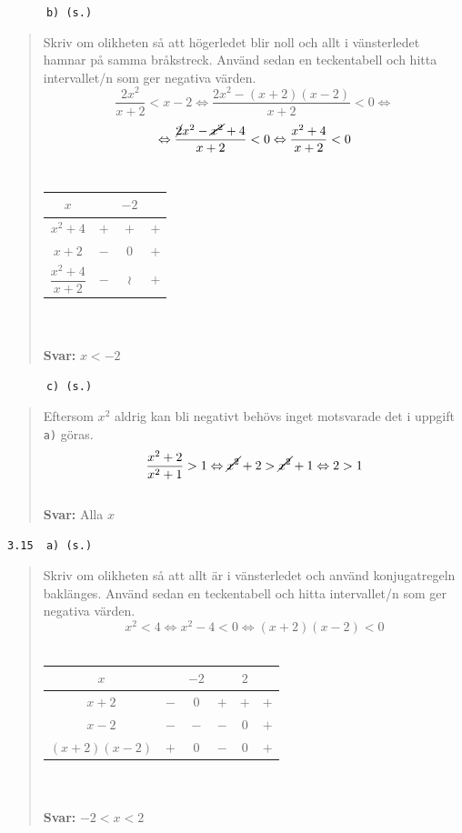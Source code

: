 \documentclass[a4paper]{article}
\newcommand{\tskcol}[1]{\textcolor{tskcol}{#1}}
\begin{document}
	\texttt{\tskcol{~~~~~~b) (s.)}}
	\begin{quotation}
		\noindent
		Skriv om olikheten så att högerledet blir noll och allt i vänsterledet hamnar på samma bråkstreck. Använd sedan en teckentabell och hitta intervallet/n som ger negativa värden.
		\[\dfrac{2x^2}{x+2}<x-2 \Leftrightarrow
		\dfrac{2x^2-(x+2)(x-2)}{x+2}<0 \Leftrightarrow\]
		\[\Leftrightarrow \dfrac{\cancel{2}x^2-\cancel{x^2}+4}{x+2}<0 \Leftrightarrow
		\dfrac{x^2+4}{x+2}<0\] \\
		\begin{tabular}{c|c|c|c}
			$x$ & & $-2$ & \\ \hline
			$x^2+4$              & $+$ & $+$ & $+$ \\
			$x+2$                & $-$ & $0$ & $+$ \\ \hline
			$\dfrac{x^2+4}{x+2}$ & $-$ &$\wr$& $+$ 
		\end{tabular}
		\\ \\
		\textbf{Svar:} $x<-2$
	\end{quotation}
	
	\pagebreak
	\texttt{\tskcol{~~~~~~c) (s.)}}
	\begin{quotation}
		\noindent
		Eftersom $x^2$ aldrig kan bli negativt behövs inget motsvarade det i uppgift \texttt{\tskcol{a)}} göras.
		\[\dfrac{x^2+2}{x^2+1}>1 \Leftrightarrow
		\cancel{x^2}+2>\cancel{x^2}+1 \Leftrightarrow
		2>1\]
		\\
		\textbf{Svar:} Alla $x$
	\end{quotation}
	
	\texttt{\tskcol{3.15~~a) (s.)}}
	\begin{quotation}
		\noindent
		Skriv om olikheten så att allt är i vänsterledet och använd konjugatregeln baklänges. Använd sedan en teckentabell och hitta intervallet/n som ger negativa värden.
		\[x^2<4 \Leftrightarrow
		x^2-4<0 \Leftrightarrow
		(x+2)(x-2)<0\] \\
		\begin{tabular}{c|c|c|c|c|c}
			$x$ & & $-2$ & & $2$ & \\ \hline
			$x+2$        & $-$ & $0$ & $+$ & $+$ & $+$ \\
			$x-2$        & $-$ & $-$ & $-$ & $0$ & $+$ \\ \hline
			$(x+2)(x-2)$ & $+$ & $0$ & $-$ & $0$ & $+$ 
		\end{tabular}
		\\ \\
		\textbf{Svar:} $-2<x<2$
	\end{quotation}
	
\end{document}
